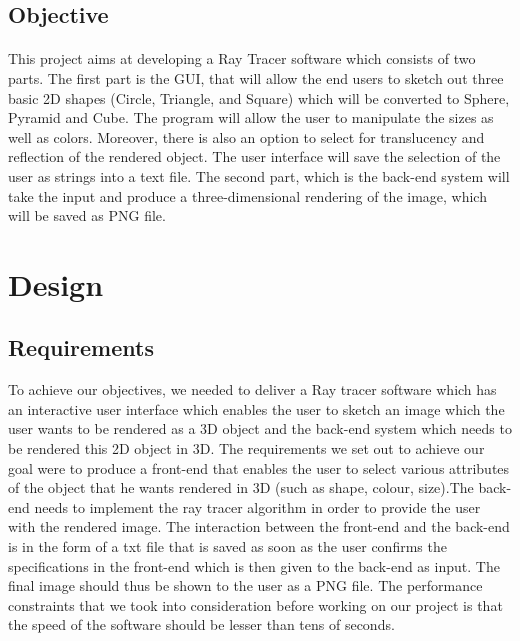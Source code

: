 \documentclass{article}
\begin{document}
\subsection{Objective}

\paragraph{}
This project aims at developing a Ray Tracer software which consists of two parts. \newline The first part is the GUI, that will allow the end users to sketch out three basic 2D shapes (Circle, Triangle, and Square) which will be converted to Sphere, Pyramid and Cube.  The program will allow the user to manipulate the sizes as well as colors. Moreover, there is also an option to select for translucency and reflection of the rendered object. The user interface will save the selection of the user as strings into a text file.
\newline The second part, which is the back-end system will take the input and produce  a three-dimensional rendering of the image, which will be saved as PNG file. 


\section{Design}

\subsection{Requirements}
To achieve our objectives, we needed to deliver a Ray tracer software which has  an interactive user interface which enables the user to sketch an image which the user wants to be rendered as a 3D object and the back-end system which needs to be rendered this 2D object in 3D. The requirements we set out to achieve our goal were to produce a front-end that enables the user to select various attributes of the object that he wants rendered in 3D (such as shape, colour, size).The back-end needs to implement the ray tracer algorithm in order to provide the user with the rendered image. The interaction between the front-end and the back-end is in the form of a txt file that is saved as soon as the user confirms the specifications in the front-end which is then given to the back-end as input. The final image should thus be shown to the user as a PNG file. The performance constraints that we took into consideration before working on our project is that the speed of the software should be lesser than tens of seconds. 
\end{document}
